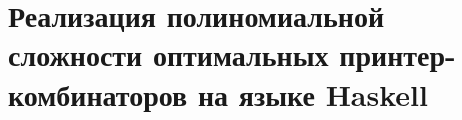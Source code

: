 \appendix

\section{Реализация полиномиальной сложности оптимальных принтер-комбинаторов на языке Haskell}
\label{app:1}


